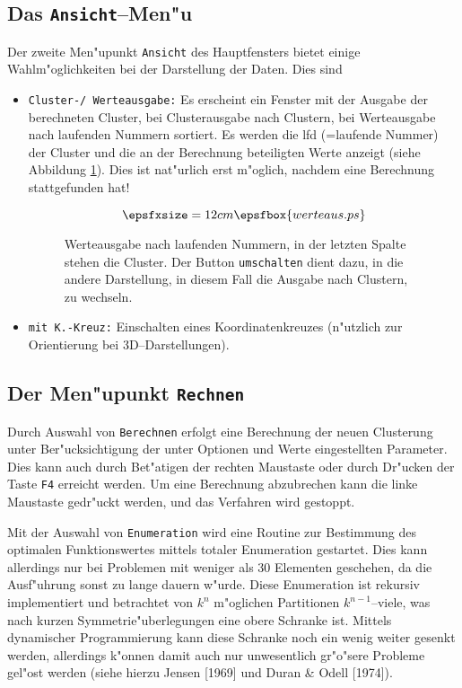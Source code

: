 \subsection*{Das {\tt Ansicht}--Men"u}
Der zweite Men"upunkt {\tt Ansicht} des Hauptfensters bietet einige 
Wahlm"oglichkeiten bei der Darstellung der Daten. Dies sind
\begin{itemize}
\item {\tt Cluster-/ Werteausgabe:} Es erscheint ein Fenster mit der 
	Ausgabe der berechneten Cluster, bei
	Clusterausgabe nach Clustern, bei Werteausgabe nach laufenden
	Nummern sortiert. Es werden die lfd (=laufende Nummer)
	der Cluster und
	die an der Berechnung beteiligten Werte anzeigt (siehe Abbildung
	\ref{Abbildungwerteaus}).
	Dies ist nat"urlich erst m"oglich, nachdem eine Berechnung
	stattgefunden hat! 

	\begin{figure}[htp]
	\[ \epsfxsize=12cm \epsfbox{werteaus.ps} \]
		\caption{\label{Abbildungwerteaus}
			Werteausgabe nach laufenden Nummern, 
			in der letzten Spalte stehen die Cluster. 
			Der Button {\tt umschalten} dient dazu, in die 
			andere Darstellung, in diesem Fall die
			Ausgabe nach Clustern, zu wechseln.}
	\end{figure}
\item {\tt mit K.-Kreuz:} Einschalten eines Koordinatenkreuzes (n"utzlich
	zur Orientierung bei 3D--Darstellungen).
\end{itemize}

\subsection*{Der Men"upunkt {\tt Rechnen }}
Durch Auswahl von {\tt Berechnen} 
erfolgt eine Berechnung der neuen Clusterung unter Ber"ucksichtigung 
der unter Optionen und Werte eingestellten
Parameter. Dies kann auch durch Bet"atigen der rechten Maustaste
oder durch Dr"ucken der Taste \verb-F4- erreicht werden.
Um eine Berechnung abzubrechen kann 
die linke Maustaste gedr"uckt werden, und
das Verfahren wird gestoppt.

Mit der Auswahl von {\tt Enumeration} wird eine Routine zur Bestimmung des
optimalen Funktionswertes mittels totaler Enumeration gestartet.
Dies kann allerdings nur bei Problemen mit weniger als 30 Elementen
geschehen, da die Ausf"uhrung sonst zu lange dauern w"urde.
Diese Enumeration ist rekursiv implementiert und betrachtet von 
$k^n$ m"oglichen Partitionen $k^{n-1}$--viele, was nach kurzen
Symmetrie"uberlegungen eine obere Schranke ist. Mittels dynamischer 
Programmierung kann diese Schranke noch ein wenig weiter gesenkt werden,
allerdings k"onnen 
damit auch nur unwesentlich gr"o"sere Probleme gel"ost werden (siehe
hierzu Jensen [1969] und Duran \& Odell [1974]).



